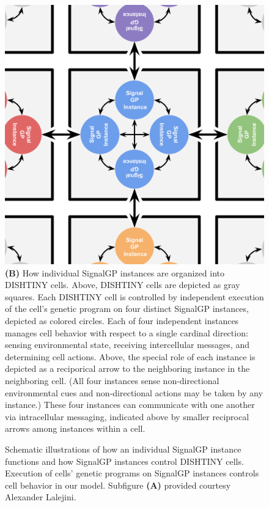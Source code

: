 \begin{figure}
\begin{center}
\begin{minipage}[t]{\linewidth}
{\hfil
\includegraphics[width=0.45\linewidth]{img/dishtinygp-cartoon}\hfil%
}\\
{\textbf{(B)}
How individual SignalGP instances are organized into DISHTINY cells.
Above, DISHTINY cells are depicted as gray squares.
Each DISHTINY cell is controlled by independent execution of the cell's genetic program on four distinct SignalGP instances, depicted as colored circles.
Each of four independent instances manages cell behavior with respect to a single cardinal direction: sensing environmental state, receiving intercellular messages, and determining cell actions.
Above, the special role of each instance is depicted as a reciporical arrow to the neighboring instance in the neighboring cell.
(All four instances sense non-directional environmental cues and non-directional actions may be taken by any instance.)
These four instances can communicate with one another via intracellular messaging, indicated above by smaller reciprocal arrows among instances within a cell.
}
\end{minipage}

\caption{
Schematic illustrations of how an individual SignalGP instance functions and how SignalGP instances control DISHTINY cells.
Execution of cells' genetic programs on SignalGP instances controls cell behavior in our model.
Subfigure \textbf{(A)} provided courtesy Alexander Lalejini.
}
\label{fig:signalgp-dishtinygp}
\end{center}
\end{figure}
